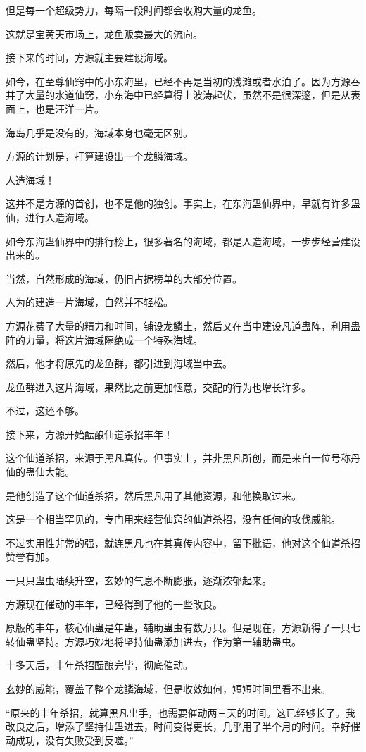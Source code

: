 \begin{this_body}
但是每一个超级势力，每隔一段时间都会收购大量的龙鱼。

这就是宝黄天市场上，龙鱼贩卖最大的流向。

接下来的时间，方源就主要建设海域。

如今，在至尊仙窍中的小东海里，已经不再是当初的浅滩或者水泊了。因为方源吞并了大量的水道仙窍，小东海中已经算得上波涛起伏，虽然不是很深邃，但是从表面上，也是汪洋一片。

海岛几乎是没有的，海域本身也毫无区别。

方源的计划是，打算建设出一个龙鳞海域。

人造海域！

这并不是方源的首创，也不是他的独创。事实上，在东海蛊仙界中，早就有许多蛊仙，进行人造海域。

如今东海蛊仙界中的排行榜上，很多著名的海域，都是人造海域，一步步经营建设出来的。

当然，自然形成的海域，仍旧占据榜单的大部分位置。

人为的建造一片海域，自然并不轻松。

方源花费了大量的精力和时间，铺设龙鳞土，然后又在当中建设凡道蛊阵，利用蛊阵的力量，将这片海域隔绝成一个特殊海域。

然后，他才将原先的龙鱼群，都引进到海域当中去。

龙鱼群进入这片海域，果然比之前更加惬意，交配的行为也增长许多。

不过，这还不够。

接下来，方源开始酝酿仙道杀招丰年！

这个仙道杀招，来源于黑凡真传。但事实上，并非黑凡所创，而是来自一位号称丹仙的蛊仙大能。

是他创造了这个仙道杀招，然后黑凡用了其他资源，和他换取过来。

这是一个相当罕见的，专门用来经营仙窍的仙道杀招，没有任何的攻伐威能。

不过实用性非常的强，就连黑凡也在其真传内容中，留下批语，他对这个仙道杀招赞誉有加。

一只只蛊虫陆续升空，玄妙的气息不断膨胀，逐渐浓郁起来。

方源现在催动的丰年，已经得到了他的一些改良。

原版的丰年，核心仙蛊是年蛊，辅助蛊虫有数万只。但是现在，方源新得了一只七转仙蛊坚持。方源巧妙地将坚持仙蛊添加进去，作为第一辅助蛊虫。

十多天后，丰年杀招酝酿完毕，彻底催动。

玄妙的威能，覆盖了整个龙鳞海域，但是收效如何，短短时间里看不出来。

“原来的丰年杀招，就算黑凡出手，也需要催动两三天的时间。这已经够长了。我改良之后，增添了坚持仙蛊进去，时间变得更长，几乎用了半个月的时间。幸好催动成功，没有失败受到反噬。”


\end{this_body}
